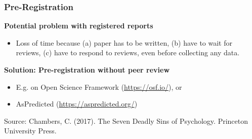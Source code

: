 \documentclass{beamer}
\begin{document}


\begin{frame}

\frametitle{Pre-Registration}

\begin{large}

\textbf{Potential problem with registered reports}

\begin{itemize}
\item  Loss of time because (a) paper has to be written, (b) have to wait for reviews, (c) have to respond to reviews, even before collecting any data. 
\end{itemize}

\textbf{Solution: Pre-registration without peer review}
\begin{itemize}
\item E.g. on Open Science Framework (\url{https://osf.io/}), or 
\item AsPredicted (\url{https://aspredicted.org/}) \\[30pt]
\end{itemize}


\end{large}

\begin{tiny}
Source: Chambers, C. (2017). The Seven Deadly Sins of Psychology. Princeton University Press. 
\end{tiny}
\end{frame}
\end{document}
